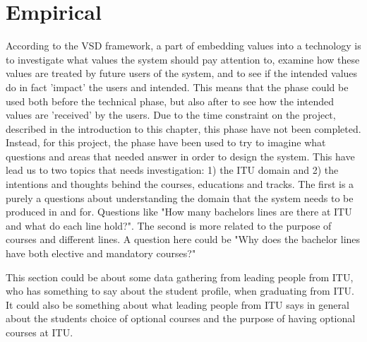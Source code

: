 \section{Empirical}
According to the VSD framework, a part of embedding values into a technology is to investigate what values the system should pay attention to, examine how these values are treated by future users of the system, and to see if the intended values do in fact 'impact' the users and intended. This means that the phase could be used both before the technical phase, but also after to see how the intended values are 'received' by the users. 
Due to the time constraint on the project, described in the introduction to this chapter, this phase have not been completed. Instead, for this project, the phase have been used to try to imagine what questions and areas that needed answer in order to design the system. This have lead us to two topics that needs investigation: 1) the ITU domain and 2) the intentions and thoughts behind the courses, educations and tracks. The first is a purely a questions about understanding the domain that the system needs to be produced in and for. Questions like "How many bachelors lines are there at ITU and what do each line hold?". The second is more related to the purpose of courses and different lines. A question here could be "Why does the bachelor lines have both elective and mandatory courses?"

This section could be about some data gathering from leading people from ITU, who has something to say about the student profile, when graduating from ITU. It could also be something about what leading people from ITU says in general about the students choice of optional courses and the purpose of having optional courses at ITU. 




